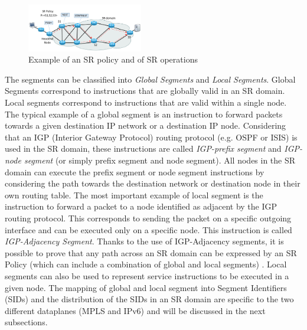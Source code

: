 \begin{figure}
    \centering
    \includegraphics[width=0.45\textwidth]{fig/sr-domain.pdf}
    \caption{Example of an SR policy and of SR operations}
    \label{fig:sr_operations}
    \vspace{-3ex}
\end{figure}


The segments can be classified into \textit{Global Segments} and \textit{Local Segments}. Global Segments correspond to instructions that are globally valid in an SR domain. Local segments correspond to instructions that are valid within a single node. The typical example of a global segment is an instruction to forward packets towards a given destination IP network or a destination IP node. Considering that an IGP (Interior Gateway Protocol) routing protocol (e.g. OSPF or ISIS) is used in the SR domain, these instructions are called \textit{IGP-prefix segment} and \textit{IGP-node segment} (or simply prefix segment and node segment). All nodes in the SR domain can execute the prefix segment or node segment instructions by considering the path towards the destination network or destination node in their own routing table. The most important example of local segment is the instruction to forward a packet to a node identified as adjacent by the IGP routing protocol. This corresponds to sending the packet on a specific outgoing interface and can be executed only on a specific node. This instruction is called \textit{IGP-Adjacency Segment}. Thanks to the use of IGP-Adjacency segments, it is possible to prove that any path across an SR domain can be expressed by an SR Policy (which can include a combination of global and local segments) \cite{pmsr}. Local segments can also be used to represent service instructions to be executed in a given node. The mapping of global and local segment into Segment Identifiers (SIDs) and the distribution of the SIDs in an SR domain are specific to the two different dataplanes (MPLS and IPv6) and will be discussed in the next subsections.

